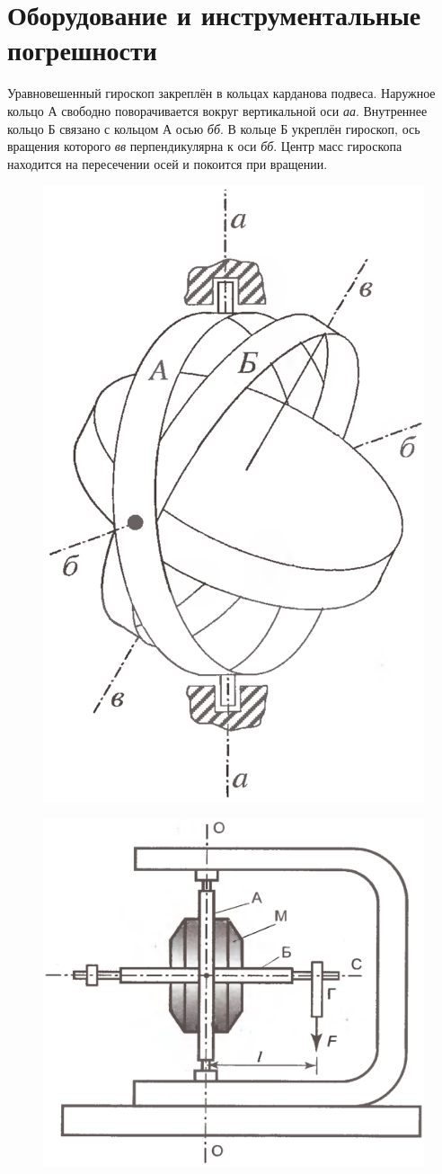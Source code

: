 \section{Оборудование и инструментальные погрешности}

Уравновешенный гироскоп закреплён в кольцах карданова подвеса. Наружное кольцо А
свободно поворачивается вокруг вертикальной оси {\itshape аа}. Внутреннее кольцо
Б связано с кольцом А осью {\itshape бб}. В кольце Б укреплён гироскоп, ось вращения
которого {\itshape вв} перпендикулярна к оси {\itshape бб}. Центр масс гироскопа находится
на пересечении осей и покоится при вращении.

\begin{figure}
    \centering\includegraphics[width=0.5\linewidth]{img/hyr.png}
\end{figure}

\begin{figure}
    \centering\includegraphics[width=0.5\linewidth]{img/hyr2.png}
\end{figure}

